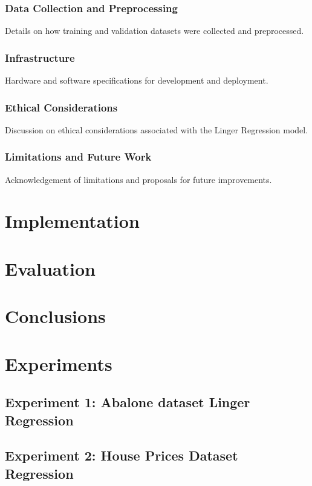 \documentclass[a4paper, 12pt]{report}
\begin{document}
\subsection{Data Collection and Preprocessing}
Details on how training and validation datasets were collected and preprocessed.

\subsection{Infrastructure}
Hardware and software specifications for development and deployment.

\subsection{Ethical Considerations}
Discussion on ethical considerations associated with the Linger Regression model.

\subsection{Limitations and Future Work}
Acknowledgement of limitations and proposals for future improvements.


\chapter{Implementation}
\label{ch:Implementation}

\chapter{Evaluation}
\label{ch:Evaluation}

\chapter{Conclusions}
\label{ch:Conclusions}

\chapter{Experiments}
\label{ch:Experimnents}

\section{Experiment 1: Abalone dataset Linger Regression}

\section{Experiment 2: House Prices Dataset Regression}
\end{document}
